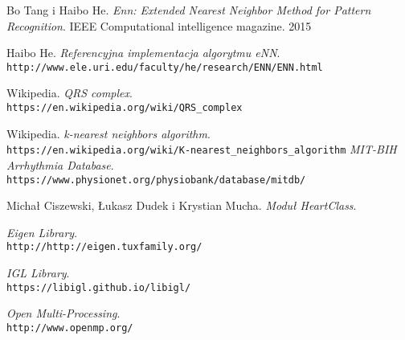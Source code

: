 \begin{thebibliography}{9}
	Bo Tang i Haibo He. 
	\textit{Enn: Extended Nearest Neighbor Method for Pattern Recognition}. 
	IEEE Computational intelligence magazine. 2015
	
	Haibo He.
	\textit{Referencyjna implementacja algorytmu eNN}.
	\\\texttt{http://www.ele.uri.edu/faculty/he/research/ENN/ENN.html}
	
	Wikipedia.
	\textit{QRS complex}.	\\\texttt{https://en.wikipedia.org/wiki/QRS\_complex}
	
	Wikipedia.
	\textit{k-nearest neighbors algorithm}.	\\\texttt{https://en.wikipedia.org/wiki/K-nearest\_neighbors\_algorithm}
	\textit{MIT-BIH Arrhythmia Database}.	\\\texttt{https://www.physionet.org/physiobank/database/mitdb/}
	
	Michał Ciszewski, Łukasz Dudek i Krystian Mucha.
	\textit{Moduł HeartClass}.
	
	\textit{Eigen Library}.
	\\\texttt{http://http://eigen.tuxfamily.org/}
	
	\textit{IGL Library}.
	\\\texttt{https://libigl.github.io/libigl/}
	
	\textit{Open Multi-Processing}.
	\\\texttt{http://www.openmp.org/}
\end{thebibliography}
